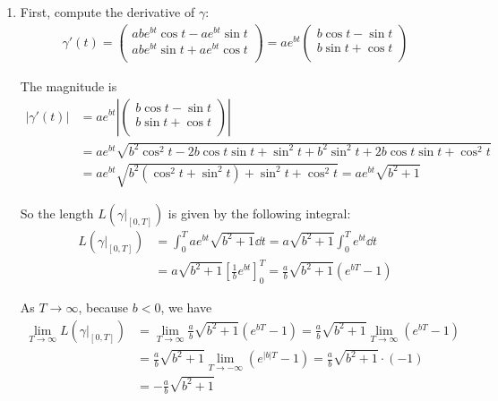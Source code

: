 \documentclass[12pt]{article}
\begin{document}
\begin{enumerate}
    \item First, compute the derivative of $\gamma$:
    \begin{align*}
        \gamma'(t) = 
        \begin{pmatrix}
            abe^{bt}\cos t - ae^{bt}\sin t \\
            abe^{bt}\sin t + ae^{bt}\cos t \\
        \end{pmatrix}
        =
        ae^{bt}\begin{pmatrix}
            b\cos t - \sin t \\
            b\sin t + \cos t \\
        \end{pmatrix}
    \end{align*}

    The magnitude is
    \begin{align*}
        |\gamma'(t)| &= 
        ae^{bt}\left|
        \begin{pmatrix}
            b\cos t - \sin t \\
            b\sin t + \cos t \\
        \end{pmatrix}
        \right| \\ &= 
        ae^{bt} \sqrt{ b^2\cos^2t - 2b\cos t \sin t + \sin^2 t + b^2\sin^2 t + 2b\cos t \sin t + \cos^2 t } \\
        &= ae^{bt} \sqrt{ b^2(\cos^2t + \sin^2 t)  + \sin^2 t + \cos^2 t } = ae^{bt} \sqrt{b^2 + 1}
    \end{align*}

    So the length $L(\gamma|_{[0, T]})$ is given by the following integral:
    \begin{align*}
        L(\gamma|_{[0, T]}) &= \int_{0}^{T} ae^{bt} \sqrt{b^2 + 1} \dd t = a\sqrt{b^2 + 1} \int_{0}^{T} e^{bt} \dd t \\
        &= a\sqrt{b^2 + 1} \left[ \frac{1}{b} e^{bt} \right]_{0}^{T} = \boxed{\frac{a}{b}\sqrt{b^2 + 1} \left( e^{bT} - 1 \right)}
    \end{align*}

    As $T \rightarrow \infty$, because $b < 0$, we have
    \begin{align*}
        \lim_{T \rightarrow \infty} L(\gamma|_{[0, T]}) 
        &= 
        \lim_{T \rightarrow \infty} \frac{a}{b}\sqrt{b^2 + 1} \left( e^{bT} - 1 \right) 
        = 
        \frac{a}{b}\sqrt{b^2 + 1} \lim_{T \rightarrow \infty} \left( e^{bT} - 1 \right)\\ 
        &= 
        \frac{a}{b}\sqrt{b^2 + 1} \lim_{T \rightarrow -\infty} \left( e^{|b|T} - 1 \right)
        =
        \frac{a}{b}\sqrt{b^2 + 1} \cdot (-1) \\
        &= -\frac{a}{b}\sqrt{b^2 + 1}
    \end{align*}


\end{enumerate}
\end{document}
